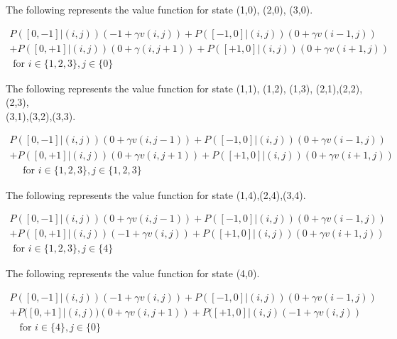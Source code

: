 \documentclass[11pt]{article}
\begin{document}
\noindent
The following represents the value function for state (1,0), (2,0), (3,0).

\begin{equation}
\begin{array}{c}
{P([0,-1] |(i, j))(-1+\gamma v(i, j))+P([-1,0] |(i, j))(0+\gamma v(i-1, j))}\\
{+P([0,+1] |(i, j))(0+\gamma(i, j+1))+P([+1,0] |(i, j))(0+\gamma v(i+1, j))}\\
{\text { for } i \in\{1,2,3\}, j \in\{0\}}
\end{array}
\end{equation}

\noindent
The following represents the value function for state (1,1), (1,2), (1,3),
(2,1),(2,2),(2,3),\\
(3,1),(3,2),(3,3).

\begin{equation}
\begin{array}{c}
{P([0,-1] |(i, j))(0+\gamma v(i, j-1))+P([-1,0] |(i, j))(0+\gamma v(i-1, j))} \\
{+P([0,+1]|(i, j))( 0+\gamma v(i, j+1))+P([+1,0] |(i, j))(0+\gamma v(i+1, j))} \\
{\quad \text { for } i \in\{1,2,3\}, j \in\{1,2,3\}}
\end{array}
\end{equation}

\noindent
The following represents the value function for state (1,4),(2,4),(3,4).

\begin{equation}
\begin{array}{c}
{P([0,-1]|(i, j))(0+\gamma v(i, j-1))+P([-1,0] |(i, j))(0+\gamma v(i-1, j))} \\
{+P([0,+1]|(i, j))(-1+\gamma v(i, j))+P([+1,0] |(i, j))(0+\gamma v(i+1, j))} \\
{ \text { for } i \in\{1,2,3\}, j \in\{4\}}
\end{array}
\end{equation}

\noindent
The following represents the value function for state (4,0).

\begin{equation}
\begin{array}{c}
{P([0,-1]|(i, j))(-1+\gamma v(i, j))+P([-1,0]|(i, j))(0+\gamma v(i-1, j))} \\
{+P([0,+1]|(i, j))(0+\gamma v(i, j+1))+P([+1,0]|(i, j)(-1+\gamma v(i, j))} \\
{\quad \text{for } i \in\{4\}, j \in\{0\}}
\end{array}
\end{equation}
\end{document}
